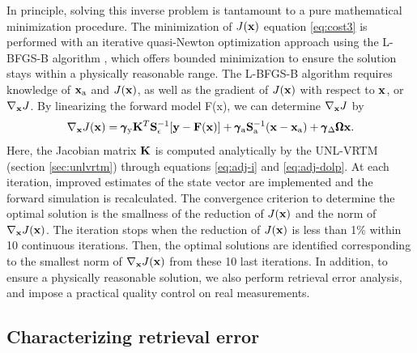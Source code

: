 In principle, solving this inverse problem is tantamount to a pure
mathematical minimization procedure. The minimization of $J(\mathbf{x})$
equation \eqref{eq:cost3}  is performed with an iterative 
quasi-Newton optimization approach using the L-BFGS-B algorithm 
\citep{Byrd95, Zhu94}, which offers bounded minimization to ensure 
the solution stays within a physically reasonable range. 
The L-BFGS-B algorithm requires knowledge of $\mathbf{x}_\text{a}$ and
$J(\mathbf{x})$, as well as the gradient of $J(\mathbf{x})$ with respect to $\mathbf{x}$,
or $\nabla_{\mathbf{x}}J$. By linearizing the forward model F(x), we can 
determine $\nabla_{\mathbf{x}}J$ by 
\begin{equation}
\nabla_{\mathbf{x}}J(\mathbf{x}) = 
   \pmb{\gamma}_\text{y}\mathbf{K}^T\mathbf{S}_\epsilon^{-1}[\mathbf{y}-\mathbf{F}(\mathbf{x})] +
   \pmb{\gamma}_\text{a}\mathbf{S}_\text{a}^{-1}(\mathbf{x}-\mathbf{x}_\text{a}) +
   \pmb{\gamma}_\Delta\pmb{\Omega}\mathbf{x}.
\label{eq:costadj}
\end{equation}
Here, the Jacobian matrix $\mathbf{K}$ is computed analytically by the
UNL-VRTM (section \ref{sec:unlvrtm}) through equations \eqref{eq:adj-i} and 
\eqref{eq:adj-dolp}. At each iteration, improved estimates of the state vector
are implemented and the forward simulation is recalculated. The
convergence criterion to determine the optimal solution is the smallness
of the reduction of $J(\mathbf{x})$ and the norm of $\nabla_{\mathbf{x}}J(\mathbf{x})$. 
The iteration stops when the reduction of $J(\mathbf{x})$ is less than 1\% 
within 10 continuous iterations. Then, the optimal solutions are 
identified corresponding to the smallest norm of $\nabla_{\mathbf{x}}J(\mathbf{x})$ from 
these 10 last iterations. In addition, to ensure a
physically reasonable solution, we also perform retrieval error
analysis, and impose a practical quality control on real measurements. 

\subsection{Characterizing retrieval error}
\label{subsec:alg-error}

